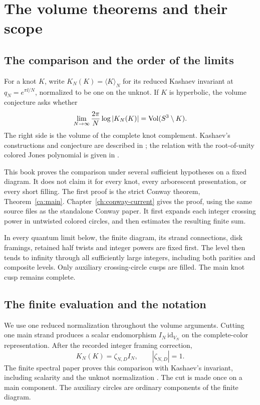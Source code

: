 \chapter{The volume theorems and their scope}\label{ch:introduction}

\section{The comparison and the order of the limits}

For a knot $K$, write $K_N(K)=\langle K\rangle_N$ for its reduced
Kashaev invariant at $q_N=e^{\pi\ii/N}$, normalized to be one on the
unknot. If $K$ is hyperbolic, the volume conjecture asks whether
\[
 \lim_{N\to\infty}\frac{2\pi}{N}\log|K_N(K)|
       =\operatorname{Vol}(S^3\setminus K).
\]
The right side is the volume of the complete knot complement.
Kashaev's constructions and conjecture are described in
\cite{Kashaev1994,Kashaev1995,Kashaev}; the relation with the
root-of-unity colored Jones polynomial is given in
\cite{MurakamiMurakami2001}.

This book proves the comparison under several sufficient hypotheses
on a fixed diagram. It does not claim it for every knot, every
arborescent presentation, or every short filling. The first proof is
the strict Conway theorem, Theorem~\ref{ca:main}. Chapter~\ref{ch:conway-current} gives the proof, using the same source
files as the standalone Conway paper. It first expands each integer
crossing power in untwisted colored circles, and then estimates the
resulting finite sum.

In every quantum limit below, the finite diagram, its strand
connections, disk framings, retained half twists and integer powers
are fixed first. The level then tends to infinity through all
sufficiently large integers, including both parities and composite
levels. Only auxiliary crossing-circle cusps are filled. The main
knot cusp remains complete.

\section{The finite evaluation and the notation}

We use one reduced normalization throughout the volume arguments.
Cutting one main strand produces a scalar endomorphism
$I_N\,\mathrm{id}_{V_N}$ on the complete-color representation.
After the recorded integer framing correction,
\[
 K_N(K)=\zeta_{N,D} I_N,\qquad |\zeta_{N,D}|=1.
\]
The finite spectral paper proves this comparison with Kashaev's
invariant, including scalarity and the unknot normalization
\cite[Theorem 10.1]{Finite}. The cut is made once on a main component.
The auxiliary circles are ordinary components of the finite diagram.


